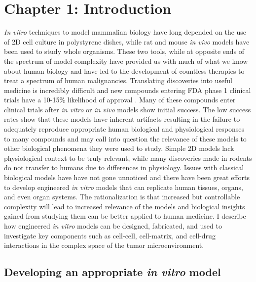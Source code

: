 \chapter{Chapter 1: Introduction}
\label{Chap:Introduction}

\textit{In vitro} techniques to model mammalian biology have long depended on the use of 2D cell culture in polystyrene dishes, while rat and mouse \textit{in vivo} models have been used to study whole organisms. These two tools, while at opposite ends of the spectrum of model complexity have provided us with much of what we know about human biology and have led to the development of countless therapies to treat a spectrum of human malignancies. Translating discoveries into useful medicine is incredibly difficult and new compounds entering FDA phase 1 clinical trials have a 10-15\% likelihood of approval \cite{Hay2014ClinicalDrugs}. Many of these compounds enter clinical trials after \textit{in vitro} or \textit{in vivo} models show initial success. The low success rates show that these models have inherent artifacts resulting in the failure to adequately reproduce appropriate human biological and physiological responses to many compounds and may call into question the relevance of these models to other biological phenomena they were used to study. Simple 2D models lack physiological context to be truly relevant, while many discoveries made in rodents do not transfer to humans due to differences in physiology. Issues with classical biological models have have not gone unnoticed and there have been great efforts to develop engineered \textit{in vitro} models that can replicate human tissues, organs, and even organ systems. The rationalization is that increased but controllable complexity will lead to increased relevance of the models and biological insights gained from studying them can be better applied to human medicine. I describe how engineered \textit{in vitro} models can be designed, fabricated, and used to investigate key components such as cell-cell, cell-matrix, and cell-drug interactions in the complex space of the tumor microenvironment.

\section{Developing an appropriate \textit{in vitro} model}

